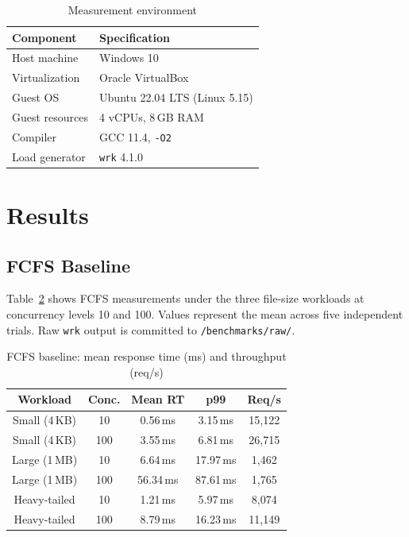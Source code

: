 \documentclass[conference]{IEEEtran}
\begin{document}
\begin{table}[h]
\centering
\caption{Measurement environment}
\label{tab:env}
\begin{tabular}{@{}ll@{}}
\toprule
\textbf{Component} & \textbf{Specification} \\
\midrule
Host machine    & Windows 10 \\
Virtualization  & Oracle VirtualBox \\
Guest OS        & Ubuntu 22.04 LTS (Linux 5.15) \\
Guest resources & 4 vCPUs, 8\,GB RAM \\
Compiler        & GCC 11.4, \texttt{-O2} \\
Load generator  & \texttt{wrk} 4.1.0 \\
\bottomrule
\end{tabular}
\end{table}

\section{Results}
\label{sec:results}

\subsection{FCFS Baseline}

Table~\ref{tab:baseline} shows FCFS measurements under the three file-size
workloads at concurrency levels 10 and 100. Values represent the mean across
five independent trials. Raw \texttt{wrk} output is committed to
\texttt{/benchmarks/raw/}.

\begin{table}[h]
\centering
\caption{FCFS baseline: mean response time (ms) and throughput (req/s)}
\label{tab:baseline}
\begin{tabular}{@{}ccccc@{}}
\toprule
\textbf{Workload} & \textbf{Conc.} & \textbf{Mean RT} & \textbf{p99} & \textbf{Req/s} \\
\midrule
Small (4\,KB)  &  10 & 0.56\,ms  & 3.15\,ms  & 15{,}122 \\
Small (4\,KB)  & 100 & 3.55\,ms  & 6.81\,ms  & 26{,}715 \\
Large (1\,MB)  &  10 & 6.64\,ms  & 17.97\,ms & 1{,}462  \\
Large (1\,MB)  & 100 & 56.34\,ms & 87.61\,ms & 1{,}765  \\
Heavy-tailed   &  10 & 1.21\,ms  & 5.97\,ms  & 8{,}074  \\
Heavy-tailed   & 100 & 8.79\,ms  & 16.23\,ms & 11{,}149 \\
\bottomrule
\end{tabular}
\end{table}
\end{document}
